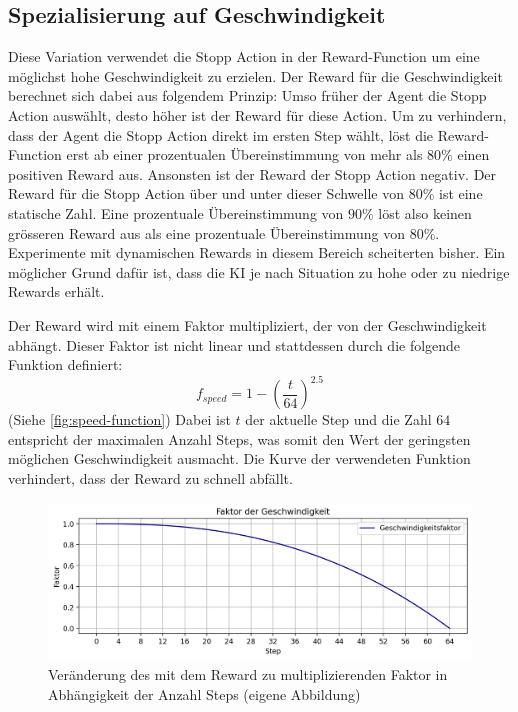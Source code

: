 \subsection{Spezialisierung auf Geschwindigkeit}\label{sub:m_var_speed} Diese
Variation verwendet die Stopp Action in der Reward-Function um eine möglichst
hohe Geschwindigkeit zu erzielen. Der Reward für die Geschwindigkeit berechnet
sich dabei aus folgendem Prinzip: Umso früher der Agent die Stopp Action
auswählt, desto höher ist der Reward für diese Action. Um zu verhindern, dass
der Agent die Stopp Action direkt im ersten Step wählt, löst die Reward-Function
erst ab einer prozentualen Übereinstimmung von mehr als $80\%$ einen positiven
Reward aus. Ansonsten ist der Reward der Stopp Action negativ. Der Reward für
die Stopp Action über und unter dieser Schwelle von $80\%$ ist eine statische
Zahl. Eine prozentuale Übereinstimmung von $90\%$ löst also keinen grösseren
Reward aus als eine prozentuale Übereinstimmung von $80\%$. Experimente mit
dynamischen Rewards in diesem Bereich scheiterten bisher. Ein möglicher Grund
dafür ist, dass die KI je nach Situation zu hohe oder zu niedrige Rewards
erhält.

Der Reward wird mit einem Faktor multipliziert, der von der Geschwindigkeit
abhängt. Dieser Faktor ist nicht linear und stattdessen durch die folgende Funktion definiert:
\[ f_{speed} = 1 - \left(\frac{t}{64}\right)^{2.5} \] (Siehe
\autoref{fig:speed-function}) Dabei ist $t$ der aktuelle Step und die Zahl $64$
entspricht der maximalen Anzahl Steps, was somit den Wert der geringsten
möglichen Geschwindigkeit ausmacht. Die Kurve der verwendeten Funktion
verhindert, dass der Reward zu schnell abfällt.

\begin{figure}[!ht]
    \centering
    \includegraphics[width=\textwidth-2cm]{images/methode/speedplot.png}
    \caption{Veränderung des mit dem Reward zu multiplizierenden Faktor in
    Abhängigkeit der Anzahl Steps (eigene
    Abbildung)}\label{fig:speed-function}
\end{figure}

